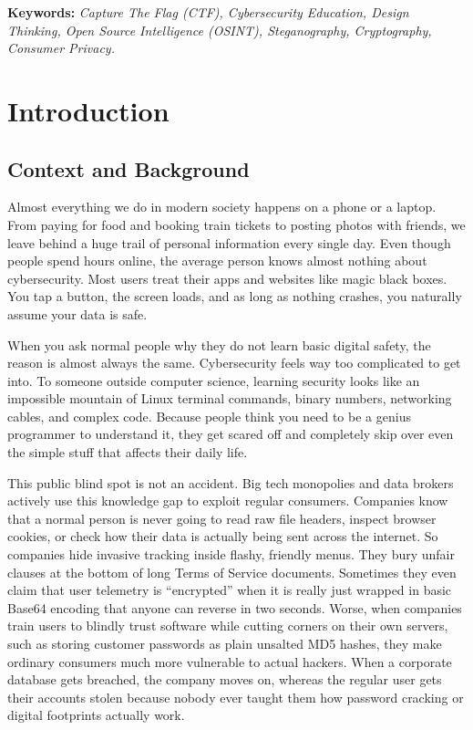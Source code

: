 \documentclass[11pt,a4paper]{article}
\begin{document}
\vspace{1em}
\noindent\textbf{Keywords:} \textit{Capture The Flag (CTF), Cybersecurity Education, Design Thinking, Open Source Intelligence (OSINT), Steganography, Cryptography, Consumer Privacy.}

\clearpage

\section{Introduction}

\subsection{Context and Background}
Almost everything we do in modern society happens on a phone or a laptop. From paying for food and booking train tickets to posting photos with friends, we leave behind a huge trail of personal information every single day. Even though people spend hours online, the average person knows almost nothing about cybersecurity. Most users treat their apps and websites like magic black boxes. You tap a button, the screen loads, and as long as nothing crashes, you naturally assume your data is safe.

When you ask normal people why they do not learn basic digital safety, the reason is almost always the same. Cybersecurity feels way too complicated to get into. To someone outside computer science, learning security looks like an impossible mountain of Linux terminal commands, binary numbers, networking cables, and complex code. Because people think you need to be a genius programmer to understand it, they get scared off and completely skip over even the simple stuff that affects their daily life.

This public blind spot is not an accident. Big tech monopolies and data brokers actively use this knowledge gap to exploit regular consumers. Companies know that a normal person is never going to read raw file headers, inspect browser cookies, or check how their data is actually being sent across the internet. So companies hide invasive tracking inside flashy, friendly menus. They bury unfair clauses at the bottom of long Terms of Service documents. Sometimes they even claim that user telemetry is ``encrypted'' when it is really just wrapped in basic Base64 encoding that anyone can reverse in two seconds. Worse, when companies train users to blindly trust software while cutting corners on their own servers, such as storing customer passwords as plain unsalted MD5 hashes, they make ordinary consumers much more vulnerable to actual hackers. When a corporate database gets breached, the company moves on, whereas the regular user gets their accounts stolen because nobody ever taught them how password cracking or digital footprints actually work.
\end{document}
